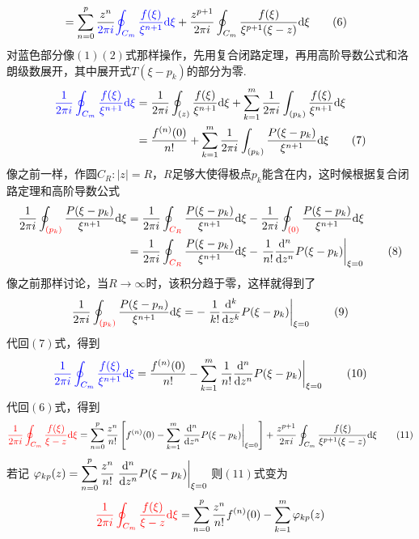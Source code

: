 \documentclass[UTF8]{ctexart}
\newcommand{\trm}[1]{{\rm #1}}
\begin{document}
{\begin{align}
    &= \sum_{n=0}^{p}\frac{z^n}{\color{blue}2\pi i}{\color{blue}\oint_{C_m}\frac{f(\xi)}{\xi^{n+1}}\trm{d}\xi}
    +\frac{z^{p+1}}{2\pi i}\oint_{C_m}\frac{f(\xi)}{\xi^{p+1}(\xi-z)}\trm{d}\xi \tag{6}
\end{align}
对蓝色部分像\((1)(2)\)式那样操作，先用复合闭路定理，再用高阶导数公式和洛朗级数展开，其中展开式\(T(\xi-p_k)\)的部分为零.
\begin{align}
    {\color{blue}\frac{1}{2\pi i}\oint_{C_m}\frac{f(\xi)}{\xi^{n+1}}\trm{d}\xi} &= 
    \frac{1}{2\pi i}\oint_{(z)}\frac{f(\xi)}{\xi^{n+1}}\trm{d}\xi
    +\sum_{k=1}^m\frac{1}{2\pi i}\int_{(p_k)}\frac{f(\xi)}{\xi^{n+1}}\trm{d}\xi \notag \\ 
    &= \frac{f^{(n)}(0)}{n!} + \sum_{k=1}^m\frac{1}{2\pi i}\int_{(p_k)}\frac{P(\xi-p_k)}{\xi^{n+1}}\trm{d}\xi \tag{7}
\end{align}
像之前一样，作圆\(C_R:|z|=R\)，\(R\)足够大使得极点\(p_k\)能含在内，这时候根据复合闭路定理和高阶导数公式
\begin{align}
    \frac{1}{2\pi i}\oint_{\color{red}(p_k)}\frac{P(\xi-p_k)}{\xi^{n+1}}\trm{d}\xi &= 
    \frac{1}{2\pi i}\oint_{\color{red}C_R}\frac{P(\xi-p_k)}{\xi^{n+1}}\trm{d}\xi
    - \frac{1}{2\pi i}\oint_{\color{red}(0)}\frac{P(\xi-p_k)}{\xi^{n+1}}\trm{d}\xi \notag \\
    &= \frac{1}{2\pi i}\oint_{\color{red}C_R}\frac{P(\xi-p_k)}{\xi^{n+1}}\trm{d}\xi 
    - \left.\frac{1}{n!}\frac{\trm{d}^{n}}{\trm{d}z^n}P(\xi-p_k)\right|_{\xi=0}
    \tag{8}
\end{align}
像之前那样讨论，当\(R \to \infty\)时，该积分趋于零，这样就得到了
\[\frac{1}{2\pi i}\oint_{\color{red}(p_k)}\frac{P(\xi-p_n)}{\xi^{n+1}}\trm{d}\xi = -\left.\frac{1}{k!}\frac{\trm{d}^{k}}{\trm{d}z^k}P(\xi-p_k)\right|_{\xi=0} \tag{9}\]
代回\((7)\)式，得到
\[{\color{blue}\frac{1}{2\pi i}\oint_{C_m}\frac{f(\xi)}{\xi^{n+1}}\trm{d}\xi} = \frac{f^{(n)}(0)}{n!} - \sum_{k=1}^m\left.\frac{1}{n!}\frac{\trm{d}^{n}}{\trm{d}z^n}P(\xi-p_k)\right|_{\xi=0} \tag{10}\]
代回\((6)\)式，得到
\[{\color{red} \frac{1}{2\pi i}\oint_{C_m}\frac{f(\xi)}{\xi-z}\trm{d}\xi} = 
\sum_{n=0}^{p}\frac{z^n}{n!}\left[f^{(n)}(0) - \sum_{k=1}^m\left.\frac{\trm{d}^{n}}{\trm{d}z^n}P(\xi-p_k)\right|_{\xi=0}\right]
+\frac{z^{p+1}}{2\pi i}\oint_{C_m}\frac{f(\xi)}{\xi^{p+1}(\xi-z)}\trm{d}\xi \tag{11}\]
若记
\(\displaystyle{\varphi_{kp}(z)=\sum_{n=0}^{p}\frac{z^n}{n!}\left.\frac{\trm{d}^{n}}{\trm{d}z^n}P(\xi-p_k)\right|_{\xi=0}}\)
则\((11)\)式变为
\[{\color{red} \frac{1}{2\pi i}\oint_{C_m}\frac{f(\xi)}{\xi-z}\trm{d}\xi} = 
\sum_{n=0}^{p}\frac{z^n}{n!}f^{(n)}(0) - \sum_{k=1}^m\varphi_{kp}(z)
\]}
\end{document}
